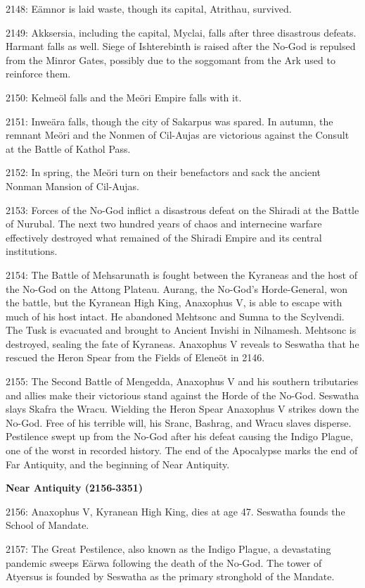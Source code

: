 \documentclass[]{book}
\begin{document}
2148: Eämnor is laid waste, though its capital, Atrithau, survived.

2149: Akksersia, including the capital, Myclai, falls after three disastrous
defeats. Harmant falls as well. Siege of Ishterebinth is raised after the No-God is
repulsed from the Minror Gates, possibly due to the soggomant from the Ark
used to reinforce them.

2150: Kelmeöl falls and the Meöri Empire falls with it.

2151: Inweära falls, though the city of Sakarpus was spared. In autumn, the remnant
Meöri and the Nonmen of Cil-Aujas are victorious against the Consult at
the Battle of Kathol Pass.

2152: In spring, the Meöri turn on their benefactors and sack the ancient Nonman
Mansion of Cil-Aujas.

2153: Forces of the No-God inflict a disastrous defeat on the Shiradi at the Battle of
Nurubal. The next two hundred years of chaos and internecine warfare
effectively destroyed what remained of the Shiradi Empire and its central
institutions.

2154: The Battle of Mehsarunath is fought between the Kyraneas and the host of the
No-God on the Attong Plateau. Aurang, the No-God's Horde-General, won the
battle, but the Kyranean High King, Anaxophus V, is able to escape with much
of his host intact. He abandoned Mehtsonc and Sumna to the Scylvendi. The
Tusk is evacuated and brought to Ancient Invishi in Nilnamesh. Mehtsonc is
destroyed, sealing the fate of Kyraneas. Anaxophus V reveals to Seswatha that
he rescued the Heron Spear from the Fields of Eleneöt in 2146.

2155: The Second Battle of Mengedda, Anaxophus V and his southern tributaries and
allies make their victorious stand against the Horde of the No-God. Seswatha
slays Skafra the Wracu. Wielding the Heron Spear Anaxophus V strikes down
the No-God. Free of his terrible will, his Sranc, Bashrag, and Wracu slaves
disperse. Pestilence swept up from the No-God after his defeat causing
the Indigo Plague, one of the worst in recorded history. The end of the
Apocalypse marks the end of Far Antiquity, and the beginning of Near
Antiquity.

\textbf{Near Antiquity (2156-3351)}

2156: Anaxophus V, Kyranean High King, dies at age 47. Seswatha founds the School
of Mandate.

2157: The Great Pestilence, also known as the Indigo Plague, a devastating pandemic
sweeps Eärwa following the death of the No-God. The tower of Atyersus is
founded by Seswatha as the primary stronghold of the Mandate.
\end{document}
